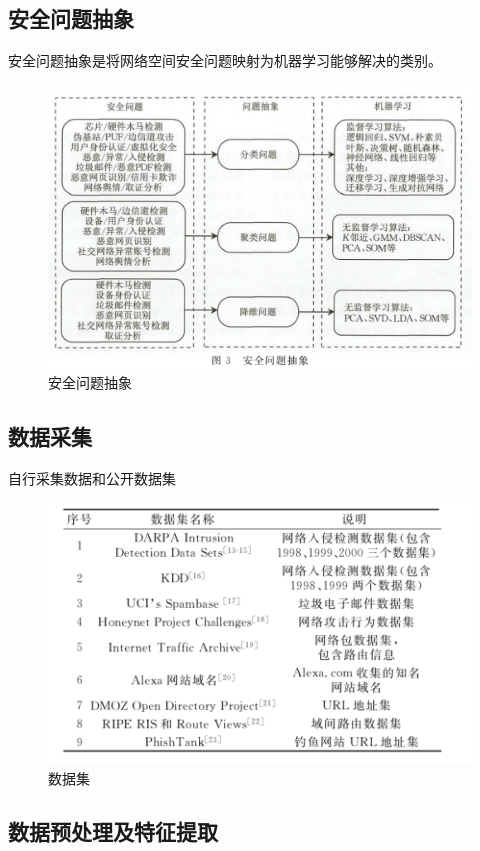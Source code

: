 \documentclass[UTF8]{ctexart}
\begin{document}
	\subsection{安全问题抽象}
	安全问题抽象是将网络空间安全问题映射为机器学习能够解决的类别。
	\begin{figure}[ht]
        \centering
        \includegraphics[scale=0.5]{picture/003.png}
        \caption{安全问题抽象}
        \label{fig:003}
    \end{figure}
    \subsection{数据采集}
	自行采集数据和公开数据集
	\begin{figure}[ht]
        \centering
        \includegraphics[scale=0.5]{picture/004.png}
        \caption{数据集}
        \label{fig:004}
    \end{figure}
    \subsection{数据预处理及特征提取}
\end{document}
